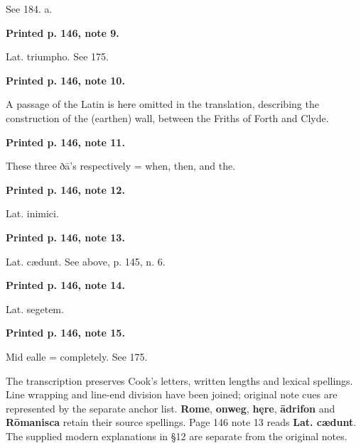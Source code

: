 See 184. a.

\textbf{Printed p. 146, note 9.}

Lat. triumpho. See 175.

\textbf{Printed p. 146, note 10.}

A passage of the Latin is here omitted in the translation, describing the construction of the (earthen) wall, between the Friths of Forth and Clyde.

\textbf{Printed p. 146, note 11.}

These three ðā’s respectively = when, then, and the.

\textbf{Printed p. 146, note 12.}

Lat. inimici.

\textbf{Printed p. 146, note 13.}

Lat. cædunt. See above, p. 145, n. 6.

\textbf{Printed p. 146, note 14.}

Lat. segetem.

\textbf{Printed p. 146, note 15.}

Mid ealle = completely. See 175.

The transcription preserves Cook’s letters, written lengths and lexical spellings. Line wrapping and line-end division have been joined; original note cues are represented by the separate anchor list. \textbf{Rome}, \textbf{onweg}, \textbf{hęre}, \textbf{ādrifon} and \textbf{Rōmanisca} retain their source spellings. Page 146 note 13 reads \textbf{Lat. cædunt}. The supplied modern explanations in §12 are separate from the original notes.

